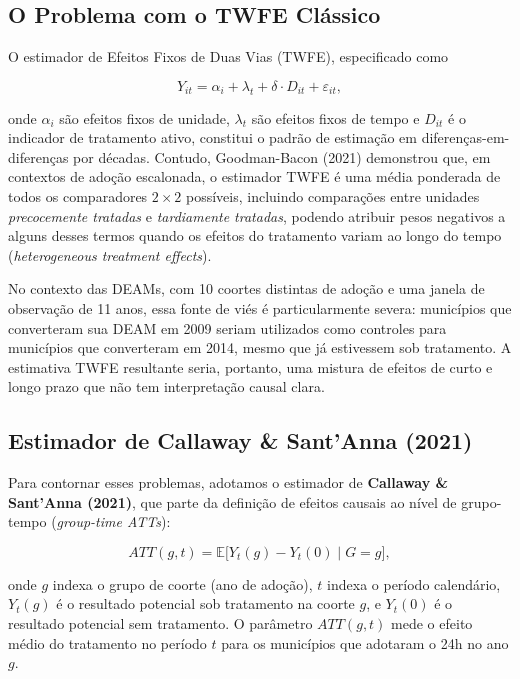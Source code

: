 \documentclass[twocolumn, 10pt]{article}
\begin{document}
\subsection{O Problema com o TWFE Clássico}

O estimador de Efeitos Fixos de Duas Vias (TWFE), especificado como

\begin{equation}
Y_{it} = \alpha_i + \lambda_t + \delta \cdot D_{it} + \varepsilon_{it},
\label{eq:twfe}
\end{equation}

\noindent onde $\alpha_i$ são efeitos fixos de unidade, $\lambda_t$ são efeitos
fixos de tempo e $D_{it}$ é o indicador de tratamento ativo, constitui o padrão
de estimação em diferenças-em-diferenças por décadas. Contudo, Goodman-Bacon
(2021) demonstrou que, em contextos de adoção escalonada, o estimador TWFE
é uma média ponderada de todos os comparadores $2\times2$ possíveis, incluindo
comparações entre unidades \textit{precocemente tratadas} e \textit{tardiamente
tratadas}, podendo atribuir pesos negativos a alguns desses termos quando os
efeitos do tratamento variam ao longo do tempo
(\textit{heterogeneous treatment effects}).

No contexto das DEAMs, com 10 coortes distintas de adoção e uma janela de
observação de 11 anos, essa fonte de viés é particularmente severa: municípios
que converteram sua DEAM em 2009 seriam utilizados como controles para
municípios que converteram em 2014, mesmo que já estivessem sob tratamento.
A estimativa TWFE resultante seria, portanto, uma mistura de efeitos de curto
e longo prazo que não tem interpretação causal clara.

\subsection{Estimador de Callaway \& Sant'Anna (2021)}

Para contornar esses problemas, adotamos o estimador de \textbf{Callaway \&
Sant'Anna (2021)}, que parte da definição de efeitos causais ao nível de
grupo-tempo (\textit{group-time ATTs}):

\begin{equation}
ATT(g, t) = \mathbb{E}\bigl[Y_{t}(g) - Y_{t}(0) \mid G = g\bigr],
\label{eq:att_gt}
\end{equation}

\noindent onde $g$ indexa o grupo de coorte (ano de adoção), $t$ indexa o
período calendário, $Y_t(g)$ é o resultado potencial sob tratamento na coorte
$g$, e $Y_t(0)$ é o resultado potencial sem tratamento. O parâmetro
$ATT(g,t)$ mede o efeito médio do tratamento no período $t$ para os
municípios que adotaram o 24h no ano $g$.
\end{document}
